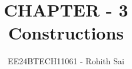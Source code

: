 \documentclass[journal]{IEEEtran}
\begin{document}

\vspace{3cm}

\title{CHAPTER - 3\\Constructions}
\author{EE24BTECH11061 - Rohith Sai}
{\let\newpage\relax\maketitle}

\renewcommand{\thefigure}{\theenumi}
\renewcommand{\thetable}{\theenumi}
\setlength{\intextsep}{10pt} %

\renewcommand{\thetable}{\theenumi}
\end{document}
